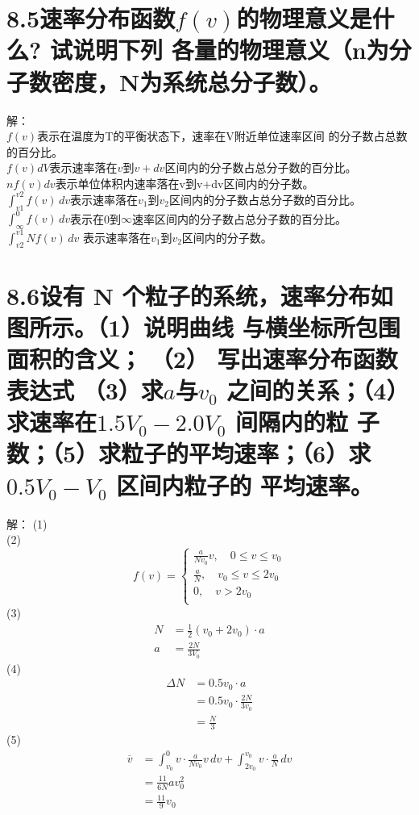 \documentclass[lang=cn]{elegantpaper}
\begin{document}
\section{
  8.5速率分布函数\(f(v)\)的物理意义是什么? 试说明下列
  各量的物理意义（n为分子数密度，N为系统总分子数）。
}
解：\\ \(f(v)\)表示在温度为T的平衡状态下，速率在V附近单位速率区间 的分子数占总数的百分比。\\
\(f(v)dV\)表示速率落在\(v\)到\(v+dv\)区间内的分子数占总分子数的百分比。\\
\(nf(v)dv\)表示单位体积内速率落在v到v+dv区间内的分子数。\\
\(\int_{v1}^{v2} f(v) \,dv \)表示速率落在\(v_1\)到\(v_2\)区间内的分子数占总分子数的百分比。
\(\int_{\infty}^{0} f(v) \,dv \)表示在0到\(\infty\)速率区间内的分子数占总分子数的百分比。\\
\(\int_{v2}^{v1} Nf(v) \,dv\) 表示速率落在\(v_1\)到\(v_2\)区间内的分子数。
\section{
  8.6设有 N 个粒子的系统，速率分布如图所示。（1）说明曲线
  与横坐标所包围面积的含义； （2） 写出速率分布函数表达式
  （3）求\(a\)与\(v_0\)
  之间的关系；（4）求速率在\(1.5V_0 - 2.0V_0\)
  间隔内的粒
  子数；（5）求粒子的平均速率；（6）求\(0.5V_0-V_0\)
  区间内粒子的
  平均速率。
}
解：
(1)\\
(2)
\[
  f(v)=  \begin{cases}
    \frac{a}{Nv_0}v,\quad 0\leqslant v\leqslant v_0 \\
    \frac{a}{N},\quad v_0\leqslant v\leqslant 2v_0\\
    0, \quad v > 2v_0\\
    \end{cases}
\]
(3)
\[
  \begin{align}
    N &= \frac{1}{2} (v_0 + 2v_0)\cdot a\\
    a &= \frac{2N}{3V_0}
  \end{align}\]
(4)
\[
  \begin{align}
    \Delta N &= 0.5v_0 \cdot a\\
    &= 0.5v_0 \cdot \frac{2N}{3v_0}\\
    &= \frac{N}{3}
  \end{align}
  \]
(5)
\[
  \begin{align}
    \overline{v} &= \int_{v_0}^{0} v \cdot \frac{a}{Nv_0}v \,dv +\int_{2v_0}^{v_0} v \cdot \frac{a}{N}\,dv \\
    &= \frac{11}{6N}av^2_0\\
    &=\frac{11}{9}v_0
  \end{align}
  \]
\end{document}
